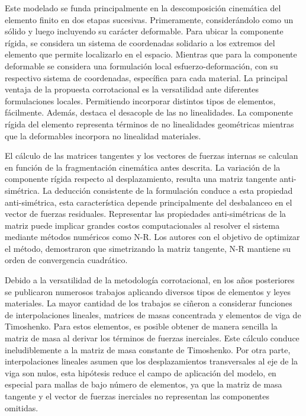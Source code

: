 Este modelado se funda principalmente en la descomposición cinemática del elemento finito en dos etapas sucesivas. Primeramente, considerándolo como un sólido y luego incluyendo su carácter deformable. Para ubicar la componente rígida, se considera un sistema de coordenadas solidario a los extremos del elemento que permite localizarlo en el espacio. Mientras que para la componente deformable se considera una formulación local esfuerzo-deformación, con su respectivo sistema de coordenadas, específica para cada material. La principal ventaja de la propuesta corrotacional es la versatilidad ante diferentes formulaciones locales. Permitiendo incorporar distintos tipos de elementos, fácilmente. Además, destaca el desacople de las no linealidades. La componente rígida del elemento representa términos de no linealidades geométricas mientras que la deformables incorpora no linealidad materiales. 

El cálculo de las matrices tangentes y los vectores de fuerzas internas se calculan en función de la fragmentación cinemática antes descrita. La variación de la componente rígida respecto al desplazamiento, resulta una matriz tangente anti-simétrica. La deducción consistente de la formulación conduce a esta propiedad anti-simétrica, esta característica depende principalmente del desbalanceo en el vector de fuerzas residuales. Representar las propiedades anti-simétricas de la matriz puede implicar grandes costos computacionales al resolver el sistema mediante métodos numéricos como \gls{N-R}. Los autores \cite{Nour-Omid1991} con el objetivo de optimizar el método, demostraron que simetrizando la matriz tangente, N-R mantiene su orden de convergencia cuadrático.

Debido a la versatilidad de la metodología corrotacional, en los años posteriores se publicaron numerosos trabajos aplicando diversos tipos de elementos y leyes materiales. La mayor cantidad de los trabajos se ciñeron a considerar funciones de interpolaciones lineales, matrices de masas concentrada y elementos de viga de Timoshenko. Para estos elementos, es posible obtener de manera sencilla la matriz de masa al derivar los términos de fuerzas inerciales. Este cálculo conduce ineludiblemente a la matriz de masa constante de Timoshenko. 
Por otra parte, interpolaciones lineales asumen que los desplazamientos transversales al eje de la viga son nulos, esta hipótesis reduce el campo de aplicación del modelo, en especial para mallas de bajo número de elementos, ya que la matriz de masa tangente y el vector de fuerzas inerciales no representan las componentes omitidas. 

